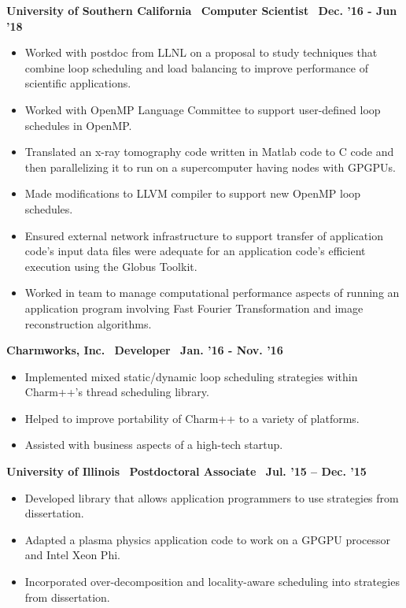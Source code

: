 \textbf{University of Southern California$\>$$\>$$\>$$\>$Computer Scientist$\>$$\>$$\>$$\>$Dec. '16 - Jun '18}
\vspace*{-0.0in} 
\begin{itemize}
\item Worked with postdoc from LLNL on a proposal to study
techniques that combine loop scheduling and load balancing to improve
performance of scientific applications.
\item Worked with OpenMP Language Committee to support user-defined loop schedules in OpenMP.
\item Translated an x-ray tomography code written in
Matlab code to C code and then parallelizing it to run on a supercomputer
having nodes with GPGPUs. 
\item Made modifications to LLVM compiler to support new OpenMP loop schedules. 
\item Ensured external network infrastructure to support transfer of application code's input data files were adequate
for an application code's efficient execution using the Globus Toolkit. 
\item Worked in team to manage computational performance aspects of running an application program involving Fast Fourier Transformation and image reconstruction algorithms. 
\end{itemize}

\textbf{Charmworks, Inc.$\>$$\>$$\>$$\>$Developer$\>$$\>$$\>$$\>$Jan. '16 - Nov. '16}
\vspace*{-0.0in}
\begin{itemize}
\item Implemented mixed static/dynamic loop scheduling
strategies within Charm++'s thread scheduling library.
\item Helped to improve portability of Charm++ to a variety of platforms. 
\item Assisted with business aspects of a high-tech startup. 
\end{itemize} 

\textbf{ University of Illinois$\>$$\>$$\>$$\>$Postdoctoral Associate$\>$$\>$$\>$$\>$Jul. '15 – Dec. '15}
\vspace*{-0.0in}
\begin{itemize} 
\item Developed library that allows application programmers to use strategies from dissertation.
\item Adapted a plasma physics application code to work on a
GPGPU processor and Intel Xeon Phi.
\item Incorporated over-decomposition and locality-aware scheduling into strategies from dissertation.
\end{itemize}

